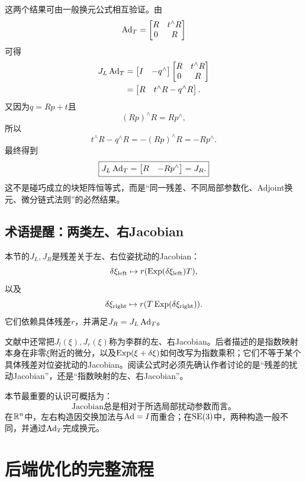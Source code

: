 这两个结果可由一般换元公式相互验证。由
\[
    \operatorname{Ad}_T=
    \begin{bmatrix}
        R&t^\wedge R\\
        0&R
    \end{bmatrix}
\]
可得
\[
\begin{aligned}
    J_L\operatorname{Ad}_T
    &=
    \begin{bmatrix}
        I&-q^\wedge
    \end{bmatrix}
    \begin{bmatrix}
        R&t^\wedge R\\
        0&R
    \end{bmatrix}\\
    &=
    \begin{bmatrix}
        R&t^\wedge R-q^\wedge R
    \end{bmatrix}.
\end{aligned}
\]
又因为$q=Rp+t$且
\[
    (Rp)^\wedge R=R p^\wedge,
\]
所以
\[
    t^\wedge R-q^\wedge R
    =-(Rp)^\wedge R
    =-R p^\wedge.
\]
最终得到
\[
    \boxed{
    J_L\operatorname{Ad}_T
    =\begin{bmatrix}R&-R p^\wedge\end{bmatrix}
    =J_R.
    }
\]
这不是碰巧成立的块矩阵恒等式，而是“同一残差、不同局部参数化、Adjoint换元、微分链式法则”的必然结果。

\subsection{术语提醒：两类左、右Jacobian}

本节的$J_L,J_R$是残差关于左、右位姿扰动的Jacobian：
\[
    \delta\xi_{\mathrm{left}}
    \mapsto r(\operatorname{Exp}(\delta\xi_{\mathrm{left}})T),
\]
以及
\[
    \delta\xi_{\mathrm{right}}
    \mapsto r(T\operatorname{Exp}(\delta\xi_{\mathrm{right}})).
\]
它们依赖具体残差$r$，并满足$J_R=J_L\operatorname{Ad}_T$。

文献中还常把$J_l(\xi),J_r(\xi)$称为李群的左、右Jacobian。后者描述的是指数映射本身在非零$\xi$附近的微分，以及$\operatorname{Exp}(\xi+\delta\xi)$如何改写为指数乘积；它们不等于某个具体残差对位姿扰动的Jacobian。阅读公式时必须先确认作者讨论的是“残差的扰动Jacobian”，还是“指数映射的左、右Jacobian”。

本节最重要的认识可概括为：
\[
    \boxed{
    \text{Jacobian总是相对于所选局部扰动参数而言。}
    }
\]
在$\mathbb{R}^n$中，左右构造因交换加法与$\operatorname{Ad}=I$而重合；在$\operatorname{SE}(3)$中，两种构造一般不同，并通过$\operatorname{Ad}_T$完成换元。


\section{后端优化的完整流程}

